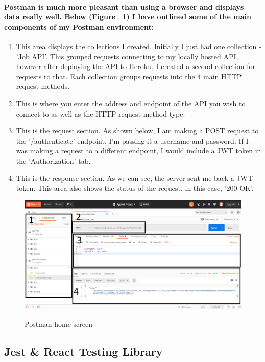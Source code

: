 \paragraph{Postman is much more pleasant than using a browser and displays data really well. Below (Figure ~\ref{postman_label}) I have outlined some of the main components of my Postman environment:}
\begin{enumerate}
    \item This area displays  the collections I created. Initially I just had one collection - 'Job API'. This grouped requests connecting to my locally hosted API, however after deploying the API to Heroku, I created a second collection for requests to that. Each collection groups requests into the 4 main HTTP request methods.
    \item This is where you enter the address and endpoint of the API you wish to connect to as well as the HTTP request method type.
    \item This is the request section. As shown below, I am making a POST request to the '/authenticate' endpoint, I'm passing it a username and password. If I was making a request to a different endpoint, I would include a JWT token in the 'Authorization' tab.
    \item This is the response section. As we can see, the server sent me back a JWT token. This area also shows the status of the request, in this case, '200 OK'. 
\end{enumerate}
\begin{figure}[ht]
    \centering
    \includegraphics[scale=0.3]{Images/postman.png} 
    \label{postman_label}
    \caption{Postman home screen}
\end{figure}
\subsection{Jest \& React Testing Library}
